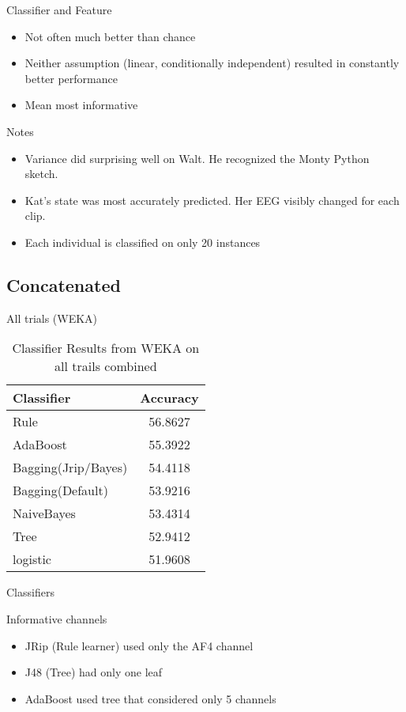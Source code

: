 \begin{frame}
    \begin{block}{Classifier and Feature} \begin{itemize}
	\item Not often much better than chance 
	\item Neither assumption (linear, conditionally independent) resulted in constantly better performance
	\item Mean most informative 
    \end{itemize} \end{block}
    \begin{block}{Notes} \begin{itemize}
    	\item Variance did surprising well on Walt. He recognized the Monty Python sketch.
    	\item Kat's state was most accurately predicted. Her EEG visibly changed for each clip.
	\item Each individual is classified on only 20 instances
    \end{itemize} \end{block}
\end{frame}
\subsection{Concatenated} 
\begin{frame}{All trials (WEKA)} 
   \begin{table}
    \begin{tabular}{l|c}
    Classifier		& Accuracy \\ \hline \hline
    Rule		&56.8627 \\ \hline
    AdaBoost		&55.3922 \\ \hline
    Bagging(Jrip/Bayes)	&54.4118 \\ \hline
    Bagging(Default)	&53.9216 \\ \hline
    NaiveBayes		&53.4314 \\ \hline
    Tree			&52.9412 \\ \hline
    logistic		&51.9608 
    \end{tabular}
    \caption{Classifier Results from WEKA on all trails combined}
   \end{table}
\end{frame}

\begin{frame}{Classifiers}
    \begin{block}{Informative channels} \begin{itemize}
	\item  JRip (Rule learner) used only the AF4 channel
	\item J48 (Tree) had only one leaf
	\item AdaBoost used tree that considered only 5 channels
    \end{itemize} \end{block}
\end{frame}



